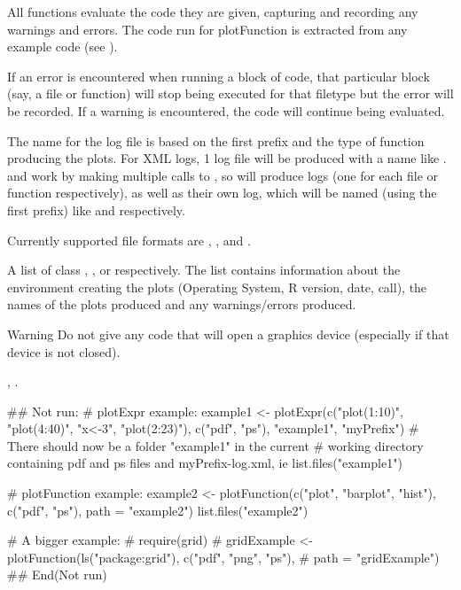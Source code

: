 \documentclass[a4paper,oneside]{book}
\begin{document}
\begin{Details}\relax
All functions evaluate the code they are given, capturing and recording any
warnings and errors. The code run for plotFunction is extracted from
any example code (see ).

If an error is encountered when running a block of code, that
particular block (say, a file or function) will stop being executed
for that filetype but the error will be recorded. If a warning is
encountered, the code will continue being evaluated.

The name for the log file is based on the first prefix and the type of
function producing the plots. For  XML logs, 1 log file
will be produced with a name like .
 and  work by making multiple calls
to , so will produce  logs (one for each
file or function respectively), as well as their own log, which will
be named (using the first prefix) like  and
 respectively.

Currently supported file formats are , , and
.
\end{Details}
\begin{Value}
A list of class , , or
 respectively. The list contains
information about the environment creating the plots (Operating
System, R version, date, call), the names of the plots produced and
any warnings/errors produced.
\end{Value}
\begin{Section}{Warning}
Do not give any code that will open a graphics device (especially if
that device is not closed).
\end{Section}
\begin{SeeAlso}\relax
{}, .
\end{SeeAlso}
\begin{Examples}
\begin{ExampleCode}
## Not run: 
  # plotExpr example:
  example1 <- plotExpr(c("plot(1:10)", "plot(4:40)", "x<-3", "plot(2:23)"),
                       c("pdf", "ps"), "example1", "myPrefix")
  # There should now be a folder "example1" in the current
  # working directory containing pdf and ps files and myPrefix-log.xml, ie
  list.files("example1")

  # plotFunction example:
  example2 <- plotFunction(c("plot", "barplot", "hist"), c("pdf", "ps"),
                           path = "example2")
  list.files("example2")

  # A bigger example:
  # require(grid)
  # gridExample <- plotFunction(ls("package:grid"), c("pdf", "png", "ps"),
  #                             path = "gridExample")
## End(Not run)
\end{ExampleCode}
\end{Examples}
\end{document}
